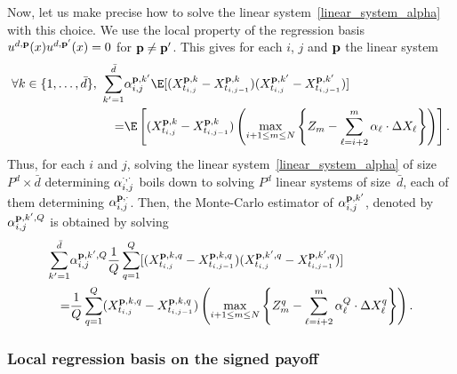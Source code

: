 Now, let us make precise how to solve the linear system~\eqref{linear_system_alpha} with this choice. We use the local property of the regression basis $u^{d,{\bf p}}(x)u^{d,{\bf p'}}(x)=0$ for ${\bf p}\not = {\bf p'}$. This gives for each $i$, $j$ and ${\bf p}$ the linear system
\begin{align*}\forall k \in \{1,\dots, \bar{d} \}, \ \sum_{k'=1}^{\bar{d}}  &\alpha_{i,j}^{{\bf p},k'} \E[(X^{{\bf p},k}_{t_{i,j}}-X^{{\bf p},k}_{t_{i,j-1}})(X^{{\bf p},k'}_{t_{i,j}}-X^{{\bf p},k'}_{t_{i,j-1}})]\\=&\E\left[(X^{{\bf p},k}_{t_{i,j}}-X^{{\bf p},k}_{t_{i,j-1}}) \left(\max_{i + 1\le m \le N} \left\{ Z_{m} - \sum_{\ell=i+2}^{m} \alpha_\ell \cdot \Delta X_\ell \right\}  \right)\right].
\end{align*}
Thus, for each $i$ and $j$, solving the linear system~\eqref{linear_system_alpha} of size $P^{d}\times \bar{d}$ determining $\alpha_{i,j}^{{\bf \cdot},\cdot}$ boils down to solving $P^{d}$ linear systems of size~$\bar{d}$, each of them determining $\alpha_{i,j}^{{\bf p},\cdot}$. Then, the Monte-Carlo estimator of $\alpha_{i,j}^{{\bf p},k'}$, denoted by $\alpha_{i,j}^{{\bf p},k',Q}$ is obtained by solving
\begin{align*}\sum_{k'=1}^{\bar{d}}  &\alpha_{i,j}^{{\bf p},k',Q}  \frac 1 Q  \sum_{q=1}^Q [(X^{{\bf p},k,q}_{t_{i,j}}-X^{{\bf p},k,q}_{t_{i,j-1}})(X^{{\bf p},k',q}_{t_{i,j}}-X^{{\bf p},k',q}_{t_{i,j-1}})]\\=&\frac 1 Q \sum_{q=1}^Q(X^{{\bf p},k,q}_{t_{i,j}}-X^{{\bf p},k,q}_{t_{i,j-1}}) \left(\max_{i + 1\le m \le N} \left\{ Z^q_{m} - \sum_{\ell=i+2}^{m} \alpha^Q_\ell \cdot \Delta X_\ell^q \right\}  \right).
\end{align*}

\subsubsection*{Local regression basis on the signed payoff}

